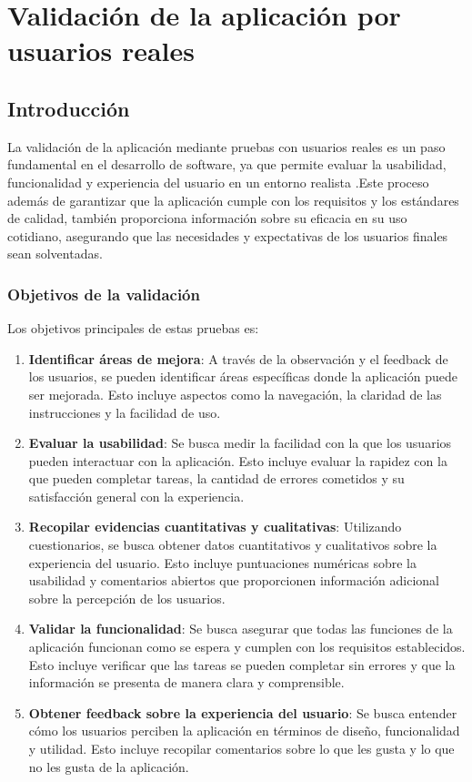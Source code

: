 \chapter{Validación de la aplicación por usuarios reales}
\label{cap:validacion}



\section{Introducción}

La validación de la aplicación mediante pruebas con usuarios reales es un paso fundamental en el desarrollo de software, 
ya que permite evaluar la usabilidad, funcionalidad y experiencia del usuario en un entorno realista \cite{rubin2008usability}.Este proceso además de
garantizar que la aplicación cumple con los requisitos y los estándares de calidad, también proporciona información 
sobre su eficacia en su uso cotidiano, asegurando que las necesidades y expectativas de los usuarios finales sean solventadas. 


\subsection{Objetivos de la validación}

Los objetivos principales de estas pruebas es: \cite{nng_usability_testing_101}

\begin{enumerate}
    \item \textbf{Identificar áreas de mejora}: A través de la observación y el feedback de los usuarios, se pueden identificar áreas específicas donde la aplicación puede ser mejorada. Esto incluye aspectos como la navegación, la claridad de las instrucciones y la facilidad de uso.
    \item \textbf{Evaluar la usabilidad}: Se busca medir la facilidad con la que los usuarios pueden interactuar con la aplicación. Esto incluye evaluar la rapidez con la que pueden completar tareas, la cantidad de errores cometidos y su satisfacción general con la experiencia.
    \item \textbf{Recopilar evidencias cuantitativas y cualitativas}: Utilizando cuestionarios, se busca obtener datos cuantitativos y cualitativos sobre la experiencia del usuario. Esto incluye puntuaciones numéricas sobre la usabilidad y comentarios abiertos que proporcionen información adicional sobre la percepción de los usuarios.
    \item \textbf{Validar la funcionalidad}: Se busca asegurar que todas las funciones de la aplicación funcionan como se espera y cumplen con los requisitos establecidos. Esto incluye verificar que las tareas se pueden completar sin errores y que la información se presenta de manera clara y comprensible.
    \item \textbf{Obtener feedback sobre la experiencia del usuario}: Se busca entender cómo los usuarios perciben la aplicación en términos de diseño, funcionalidad y utilidad. Esto incluye recopilar comentarios sobre lo que les gusta y lo que no les gusta de la aplicación.
\end{enumerate}


